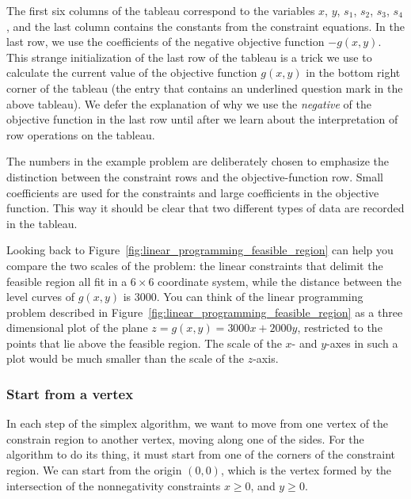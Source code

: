 \documentclass[11pt,oneside]{article}
\begin{document}
		\noindent
		The first six columns of the tableau correspond to the variables $x$, $y$, $s_1$, $s_2$, $s_3$, $s_4$,
		and the last column contains the constants from the constraint equations.
 		In the last row, we use the coefficients of the negative objective function $-g(x,y)$.
		This strange initialization of the last row of the tableau is a trick we use to calculate the current value of the objective function $g(x,y)$
		in the bottom right corner of the tableau (the entry that contains an underlined question mark in the above tableau).
		We defer the explanation of why we use the \emph{negative} of the objective function 
		in the last row until after we learn about the interpretation of row operations on the tableau.
		
		The numbers in the example problem are deliberately chosen to emphasize the distinction between
		the constraint rows and the objective-function row.
		Small coefficients are used for the constraints and large coefficients in the objective function.
		This way it should be clear that two different types of data are recorded in the tableau.

		Looking back to Figure~\ref{fig:linear_programming_feasible_region}
		can help you compare the two scales of the problem: 
		the linear constraints that delimit the feasible region all fit in a $6\times 6$ coordinate system,
		while the distance between the level curves of $g(x,y)$ is $3000$.
		You can think of the linear programming problem described in Figure~\ref{fig:linear_programming_feasible_region}
		as a three dimensional plot of the plane $z=g(x,y)=3000x+2000y$,
		restricted to the points that lie above the feasible region.
		The scale of the $x$- and $y$-axes in such a plot would be much smaller than the scale of the $z$-axis.
		
		

	\subsubsection{Start from a vertex}
	
		In each step of the simplex algorithm,
		we want to move from one vertex of the constrain region to another vertex,
		moving along one of the sides.
		For the algorithm to do its thing,
		it must start from one of the corners of the constraint region.
		We can start from the origin $(0,0)$,
		which is the vertex formed by the intersection of the nonnegativity constraints $x\geq 0$, and $y \geq 0$.
		
\end{document}
